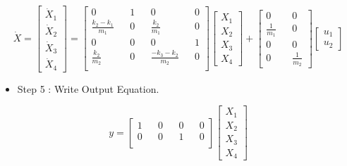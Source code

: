 \documentclass[12pt,a4paper]{article}
\begin{document}
	\[
	\dot{X} = 
	\begin{bmatrix}
		\dot{X}_1 \\
		\dot{X}_2 \\
		\dot{X}_3 \\
		\dot{X}_4 
	\end{bmatrix} =
	\begin{bmatrix}
		0                     &   & 1 &   & 0                      &   & 0 \\
		\frac{k_2 - k_1}{m_1} &   & 0 &   & \frac{k_2}{m_1}        &   & 0 \\
		0                     &   & 0 &   & 0                      &   & 1 \\
		\frac{k_2}{m_2}       &   & 0 &   & \frac{-k_3 - k_2}{m_2} &   & 0 \\
	\end{bmatrix}
	\begin{bmatrix}
		X_1 \\
		X_2 \\
		X_3 \\
		X_4 
	\end{bmatrix} +
	\begin{bmatrix}
		0             &   & 0             \\
		\frac{1}{m_1} &   & 0             \\
		0             &   & 0             \\
		0             &   & \frac{1}{m_2} 
	\end{bmatrix}
	\begin{bmatrix}
		u_1 \\
		u_2 
	\end{bmatrix}
	\]
	\begin{itemize}
		\item Step 5 : Write Output Equation.
	\end{itemize}
	\[
	y =
	\begin{bmatrix}
		1 &   & 0 &   & 0 &   & 0 \\ 
		0 &   & 0 &   & 1 &   & 0 \\ 
	\end{bmatrix}
	\begin{bmatrix}
		X_1 \\
		X_2 \\
		X_3 \\
		X_4 
	\end{bmatrix}
	\]
	
\end{document}
